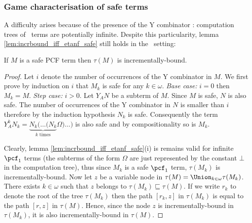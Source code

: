 \subsubsection{Game characterisation of safe terms}

A difficulty arises because of the presence of the Y combinator :
computation trees of \pcf\ terms are potentially infinite. Despite
this particularity, lemma \ref{lem:incrbound_iff_etanf_safe} still
holds in the \pcf\ setting:
\begin{lemma} \label{lem:pcf_safe_imp_incrbound} If $M$ is a safe
PCF term then $\tau(M)$ is incrementally-bound.
\end{lemma}
\begin{proof}
Let $i$ denote the number of occurrences of the Y combinator in $M$.
We first prove by induction on $i$ that $M_k$ is safe for any $k\in
\omega$. \emph{Base case:} $i=0$ then $M_k = M$. \emph{Step case:}
$i>0$. Let $Y_A N$ be a subterm of $M$. Since $M$ is safe, $N$ is
also safe. The number of occurrences of the Y combinator in $N$ is
smaller than $i$ therefore by the induction hypothesis $N_k$ is
safe. Consequently the term $Y_A^k N_k = \underbrace{N_k ( \ldots (
N_k}_{k \mbox{ times}} \Omega ) \ldots )$ is also safe and by
compositionality so is $M_k$.

Clearly, lemma \ref{lem:incrbound_iff_etanf_safe}(i) is remains
valid for infinite $\pcf_1$ terms (the subterms of the form $\Omega$
are just represented by the constant $\bot$ in the computation
tree), thus since $M_k$ is a safe $\pcf_1$ term, $\tau(M_k)$ is
incrementally-bound. Now let $z$ be a variable node in $\tau(M) =
\Union_{k\in\omega} \tau(M_k)$. There exists $k\in \omega$ such that
$z$ belongs to $\tau(M_k) \sqsubseteq \tau(M)$. If we write $r_k$ to
denote the root of the tree $\tau(M_k)$ then the path $[r_k,z]$ in
$\tau(M_k)$ is equal to the path $[r,z]$ in $\tau(M)$. Hence, since
the node $z$ is incrementally-bound in $\tau(M_k)$, it is also
incrementally-bound in $\tau(M)$.
\end{proof}


